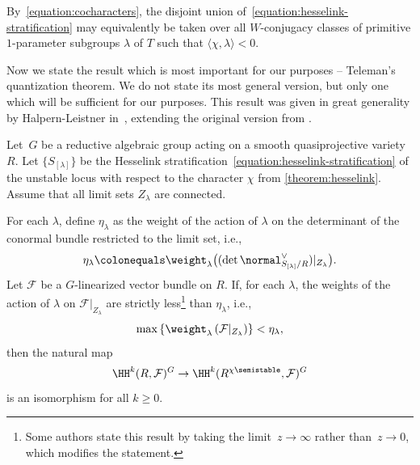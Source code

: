 \begin{remark}
\label{remark:indexing-set}
By~\eqref{equation:cocharacters},
the disjoint union of~\eqref{equation:hesselink-stratification} may equivalently be taken over
all $W$-conjugacy classes of primitive $1$-parameter subgroups $\lambda$ of $T$
such that $\langle \chi,\lambda \rangle < 0$.
\end{remark}

Now we state the result which is most important for our purposes -- Teleman's quantization theorem.
We do not state its most general version, but only one which will be sufficient for our purposes.
This result was given in great generality by Halpern-Leistner in~\cite[Th.\,3.29]{MR3327537},
extending the original version from \cite[Prop.\,2.11 \& Rem.\,2.12(i)]{MR1792291}.

\begin{theorem}[Teleman]
\label{theorem:teleman-quantization}
Let~$G$ be a reductive algebraic group
acting on a smooth quasiprojective variety~$R$.
Let $\{S_{[\lambda]}\}$ be the Hesselink stratification~\eqref{equation:hesselink-stratification} of the unstable locus
with respect to the character $\chi$ from \cref{theorem:hesselink}.
Assume that all limit sets $Z_\lambda$ are connected.

For each $\lambda$, define $\eta_\lambda$ as the weight of the action of $\lambda$
on the determinant of the conormal bundle restricted to the limit set, i.e.,
\begin{equation}
\label{equation:eta-lambda}
\eta_\lambda\colonequals\weight_\lambda \bigl( (\det \normal_{S_{[\lambda]}/R}^\vee) |_{Z_\lambda} \bigr).
\end{equation}
Let $\mathcal{F}$ be a $G$-linearized vector bundle on $R$.
If, for each $\lambda$, the weights of the action of $\lambda$ on $\mathcal{F}|_{Z_\lambda}$
are strictly less\footnote{Some authors state this result
by taking the limit~$z\to\infty$ rather than~$z\to0$,
which modifies the statement.}
than $\eta_\lambda$,
i.e.,
\begin{equation}
\label{equation:teleman-inequality-general}
\max\left\{ \weight_\lambda\left( \mathcal{F}|_{Z_\lambda} \right) \right\}<\eta_\lambda,
\end{equation}
then the natural map
\begin{equation*}
\HH^k(R,\mathcal{F})^G \to \HH^k(R^{\chi\semistable},\mathcal{F})^G
\end{equation*}
is an isomorphism for all $k \geq 0$.
\end{theorem}

